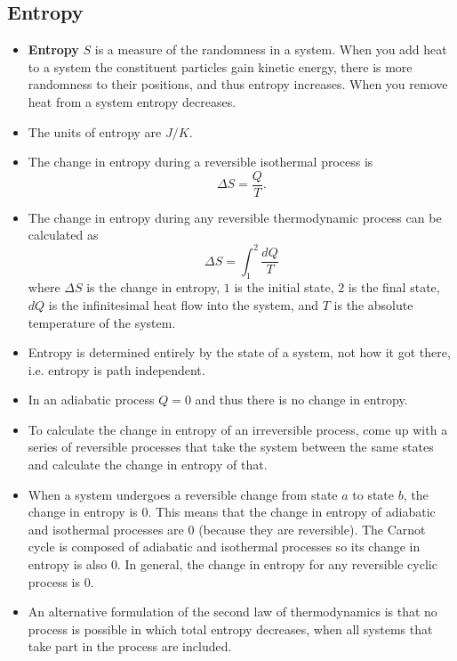 \documentclass{article}
\begin{document}
\subsection{Entropy}

\begin{itemize}
  \item \textbf{Entropy} $S$ is a measure of the randomness in a system. When you add heat to a system the constituent particles gain kinetic energy, there is more randomness to their positions, and thus entropy increases. When you remove heat from a system entropy decreases.

  \item The units of entropy are $\unit{J/K}$.

  \item The change in entropy during a reversible isothermal process is \[\Delta S = \frac{Q}{T}.\]

  \item The change in entropy during any reversible thermodynamic process can be calculated as \[\Delta S = \int_1^2 \frac{d Q}{T}\] where $\Delta S$ is the change in entropy, $1$ is the initial state, $2$ is the final state, $d Q$ is the infinitesimal heat flow into the system, and $T$ is the absolute temperature of the system.

  \item Entropy is determined entirely by the state of a system, not how it got there, i.e. entropy is path independent.

  \item In an adiabatic process $Q = 0$ and thus there is no change in entropy.

  \item To calculate the change in entropy of an irreversible process, come up with a series of reversible processes that take the system between the same states and calculate the change in entropy of that.

  \item When a system undergoes a reversible change from state $a$ to state $b$, the change in entropy is $0$. This means that the change in entropy of adiabatic and isothermal processes are $0$ (because they are reversible). The Carnot cycle is composed of adiabatic and isothermal processes so its change in entropy is also $0$. In general, the change in entropy for any reversible cyclic process is $0$.

  \item An alternative formulation of the second law of thermodynamics is that no process is possible in which total entropy decreases, when all systems that take part in the process are included.
\end{itemize}
\end{document}
